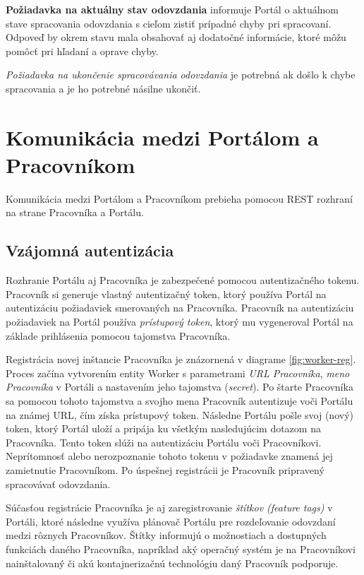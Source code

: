 \documentclass[
  digital, %
  oneside, %
  table,   %
  lof,     %
  lot,   %
]{fithesis3}
\begin{document}
\textbf{Požiadavka na aktuálny stav odovzdania} informuje Portál o aktuálnom stave spracovania odovzdania s cieľom zistiť prípadné chyby pri spracovaní. Odpoveď by okrem stavu mala obsahovať aj dodatočné informácie, ktoré môžu pomôcť pri hľadaní a oprave chyby.

\emph{Požiadavka na ukončenie spracovávania odovzdania} je potrebná ak došlo k chybe spracovania a je ho potrebné násilne ukončiť.

\section{Komunikácia medzi Portálom a Pracovníkom}

Komunikácia medzi Portálom a Pracovníkom prebieha pomocou REST rozhraní na strane Pracovníka a Portálu. 

\subsection{Vzájomná autentizácia}
\label{komunikacia-portal-pracovnik}

Rozhranie Portálu aj Pracovníka je zabezpečené pomocou autentizačného tokenu. Pracovník si generuje vlastný autentizačný token, ktorý používa Portál na autentizáciu požiadaviek smerovaných na Pracovníka. Pracovník na autentizáciu požiadaviek na Portál používa \emph{prístupový token}, ktorý mu vygeneroval Portál na základe prihlásenia pomocou tajomstva Pracovníka.

Registrácia novej inštancie Pracovníka je znázornená v diagrame \ref{fig:worker-reg}. Proces začína vytvorením entity Worker s parametrami \emph{URL Pracovníka}, \emph{meno Pracovníka} v Portáli a nastavením jeho tajomstva (\emph{secret}). Po štarte Pracovníka sa pomocou tohoto tajomstva a svojho mena Pracovník autentizuje voči Portálu na známej URL, čím získa prístupový token. Následne Portálu pošle svoj (nový) token, ktorý Portál uloží a pripája ku všetkým nasledujúcim dotazom na Pracovníka. Tento token slúži na autentizáciu Portálu voči Pracovníkovi. Neprítomnosť alebo nerozpoznanie tohoto tokenu v požiadavke znamená jej zamietnutie Pracovníkom. Po úspešnej registrácii je Pracovník pripravený spracovávať odovzdania.

Súčasťou registrácie Pracovníka je aj zaregistrovanie \emph{štítkov (feature tags)} v Portáli, ktoré následne využíva plánovač Portálu pre rozdeľovanie odovzdaní medzi rôznych Pracovníkov. Štítky informujú o možnostiach a dostupných funkciách daného Pracovníka, napríklad aký operačný systém je na Pracovníkovi nainštalovaný či akú kontajnerizačnú technológiu daný Pracovník podporuje. 
\end{document}
